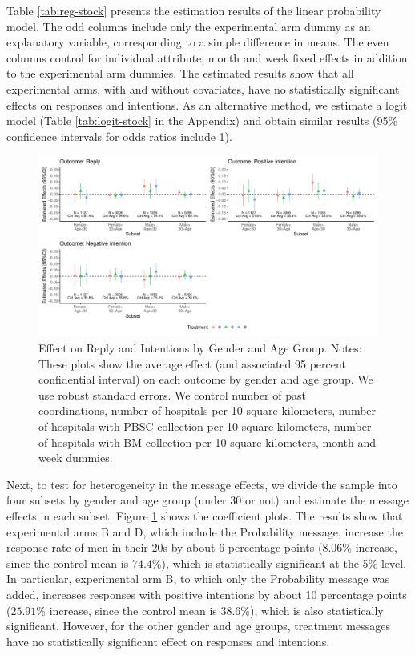 \documentclass[
]{article}
\begin{document}
Table \ref{tab:reg-stock} presents the estimation results of the linear probability model. The odd columns include only the experimental arm dummy as an explanatory variable, corresponding to a simple difference in means. The even columns control for individual attribute, month and week fixed effects in addition to the experimental arm dummies. The estimated results show that all experimental arms, with and without covariates, have no statistically significant effects on responses and intentions. As an alternative method, we estimate a logit model (Table \ref{tab:logit-stock} in the Appendix) and obtain similar results (95\% confidence intervals for odds ratios include 1).

\begin{figure}[t]
\includegraphics{body_files/figure-latex/coefplot-reg-stock-subset-1} \caption{Effect on Reply and Intentions by Gender and Age Group. Notes: These plots show the average effect (and associated 95 percent confidential interval) on each outcome by gender and age group. We use robust standard errors. We control number of past coordinations, number of hospitals per 10 square kilometers, number of hospitals with PBSC collection per 10 square kilometers, number of hospitals with BM collection per 10 square kilometers, month and week dummies.}\label{fig:coefplot-reg-stock-subset}
\end{figure}

Next, to test for heterogeneity in the message effects, we divide the sample into four subsets by gender and age group (under 30 or not) and estimate the message effects in each subset. Figure \ref{fig:coefplot-reg-stock-subset} shows the coefficient plots. The results show that experimental arms B and D, which include the Probability message, increase the response rate of men in their 20s by about 6 percentage points (\(8.06\)\% increase, since the control mean is \(74.4\)\%), which is statistically significant at the 5\% level. In particular, experimental arm B, to which only the Probability message was added, increases responses with positive intentions by about 10 percentage points (\(25.91\)\% increase, since the control mean is \(38.6\)\%), which is also statistically significant. However, for the other gender and age groups, treatment messages have no statistically significant effect on responses and intentions.
\end{document}
